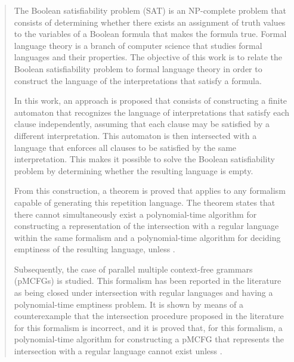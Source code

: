 \begin{abstract}
	The Boolean satisfiability problem (SAT) is an NP-complete problem that consists of determining whether there exists an assignment of truth values to the variables of a Boolean formula that makes the formula true. Formal language theory is a branch of computer science that studies formal languages and their properties. The objective of this work is to relate the Boolean satisfiability problem to formal language theory in order to construct the language of the interpretations that satisfy a formula.

	In this work, an approach is proposed that consists of constructing a finite automaton that recognizes the language of interpretations that satisfy each clause independently, assuming that each clause may be satisfied by a different interpretation. This automaton is then intersected with a language that enforces all clauses to be satisfied by the same interpretation. This makes it possible to solve the Boolean satisfiability problem by determining whether the resulting language is empty.

	From this construction, a theorem is proved that applies to any formalism capable of generating this repetition language. The theorem states that there cannot simultaneously exist a polynomial-time algorithm for constructing a representation of the intersection with a regular language within the same formalism and a polynomial-time algorithm for deciding emptiness of the resulting language, unless \pnp.

	Subsequently, the case of parallel multiple context-free grammars (pMCFGs) is studied. This formalism has been reported in the literature as being closed under intersection with regular languages and having a polynomial-time emptiness problem. It is shown by means of a counterexample that the intersection procedure proposed in the literature for this formalism is incorrect, and it is proved that, for this formalism, a polynomial-time algorithm for constructing a pMCFG that represents the intersection with a regular language cannot exist unless \pnp.

\end{abstract}
